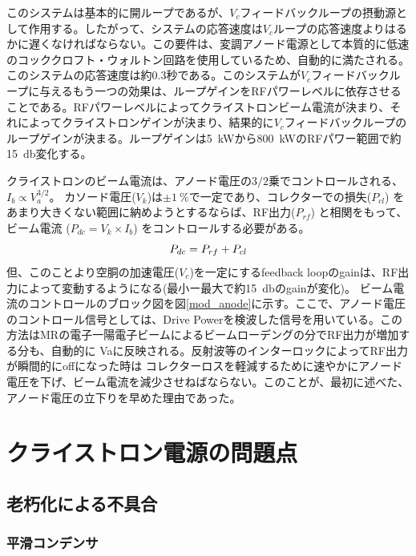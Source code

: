 \documentclass[10pt,a4paper,book,openany]{jlreq}
\theoremstyle{definition}
\begin{document}
このシステムは基本的に開ループであるが、$V_c$フィードバックループの摂動源として作用する。したがって、システムの応答速度は$V_c$ループの応答速度よりはるかに遅くなければならない。この要件は、変調アノード電源として本質的に低速のコッククロフト・ウォルトン回路を使用しているため、自動的に満たされる。このシステムの応答速度は約0.3秒である。このシステムが$V_c$フィードバックループに与えるもう一つの効果は、ループゲインをRFパワーレベルに依存させることである。RFパワーレベルによってクライストロンビーム電流が決まり、それによってクライストロンゲインが決まり、結果的に$V_c$フィードバックループのループゲインが決まる。ループゲインは\qty{5}{\kilo\watt}から\qty{800}{\kilo\watt}のRFパワー範囲で約\qty{15}{\decibel}変化する。


クライストロンのビーム電流は、アノード電圧の$3/2$乗でコントロールされる、$I_b \propto V_a^{3/2}$。 カソード電圧($V_k$)は$\pm\qty{1}{\percent}$で一定であり、コレクターでの損失($P_{cl}$) をあまり大きくない範囲に納めようとするならば、RF出力($P_{rf}$) と相関をもって、ビーム電流 ($P_{dc} = V_k\times I_b$) をコントロールする必要がある。
%
\begin{equation}
    P_{dc} = P_{rf} + P_{cl} \notag
\end{equation}
%
但、このことより空胴の加速電圧($V_c$)を一定にするfeedback loopのgainは、RF出力によって変動するようになる(最小ー最大で約\qty{15}{\decibel}のgainが変化)。
ビーム電流のコントロールのブロック図を図\ref{mod_anode}に示す。ここで、アノード電圧のコントロール信号としては、Drive Powerを検波した信号を用いている。この方法はMRの電子一陽電子ビームによるビームローデングの分でRF出力が増加する分も、自動的に Vaに反映される。反射波等のインターロックによってRF出力が瞬間的にoffになった時は コレクターロスを軽減するために速やかにアノード電圧を下げ、ビーム電流を減少させねばならない。このことが、最初に述べた、アノード電圧の立下りを早めた理由であった。



\chapter{クライストロン電源の問題点}

\section{老朽化による不具合}
\subsection{平滑コンデンサ}
\end{document}
